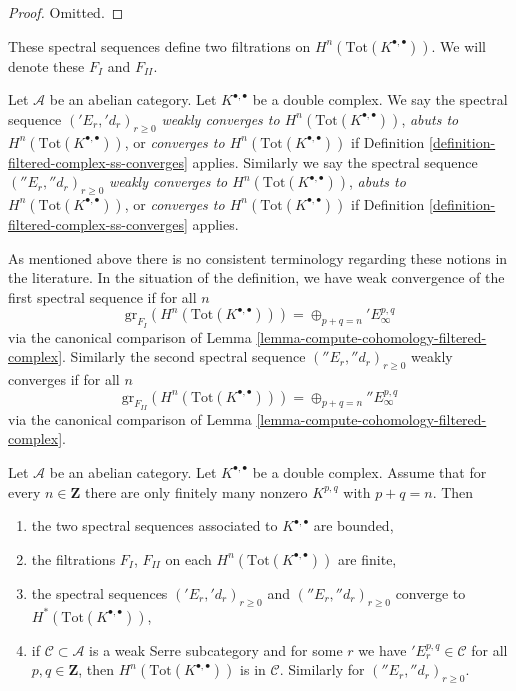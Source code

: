 \begin{proof}
Omitted.
\end{proof}

\noindent
These spectral sequences define two filtrations on
$H^n(\text{Tot}(K^{\bullet, \bullet}))$.
We will denote these $F_I$ and $F_{II}$.

\begin{definition}
\label{definition-ss-double-complex-converge}
Let $\mathcal{A}$ be an abelian category.
Let $K^{\bullet, \bullet}$ be a double complex.
We say the spectral sequence $({}'E_r, {}'d_r)_{r \geq 0}$
{\it weakly converges to $H^n(\text{Tot}(K^{\bullet, \bullet}))$},
{\it abuts to $H^n(\text{Tot}(K^{\bullet, \bullet}))$}, or
{\it converges to $H^n(\text{Tot}(K^{\bullet, \bullet}))$}
if Definition \ref{definition-filtered-complex-ss-converges} applies.
Similarly we say the spectral sequence $({}''E_r, {}''d_r)_{r \geq 0}$
{\it weakly converges to $H^n(\text{Tot}(K^{\bullet, \bullet}))$},
{\it abuts to $H^n(\text{Tot}(K^{\bullet, \bullet}))$}, or
{\it converges to $H^n(\text{Tot}(K^{\bullet, \bullet}))$}
if Definition \ref{definition-filtered-complex-ss-converges} applies.
\end{definition}

\noindent
As mentioned above there is no consistent terminology regarding these
notions in the literature. In the situation of the definition, we have
weak convergence of the first spectral sequence if for all $n$
$$
\text{gr}_{F_I}(H^n(\text{Tot}(K^{\bullet, \bullet}))) =
\oplus_{p + q = n} {}'E_\infty^{p, q}
$$
via the canonical comparison of
Lemma \ref{lemma-compute-cohomology-filtered-complex}.
Similarly the second spectral sequence $({}''E_r, {}''d_r)_{r \geq 0}$
weakly converges if for all $n$
$$
\text{gr}_{F_{II}}(H^n(\text{Tot}(K^{\bullet, \bullet}))) =
\oplus_{p + q = n} {}''E_\infty^{p, q}
$$
via the canonical comparison of
Lemma \ref{lemma-compute-cohomology-filtered-complex}.

\begin{lemma}
\label{lemma-first-quadrant-ss}
Let $\mathcal{A}$ be an abelian category. Let $K^{\bullet, \bullet}$
be a double complex. Assume that for every $n \in \mathbf{Z}$ there are
only finitely many nonzero $K^{p, q}$ with $p + q = n$. Then
\begin{enumerate}
\item the two spectral sequences associated to $K^{\bullet, \bullet}$
are bounded,
\item the filtrations $F_I$, $F_{II}$ on each
$H^n(\text{Tot}(K^{\bullet, \bullet}))$ are finite,
\item the spectral sequences $({}'E_r, {}'d_r)_{r \geq 0}$ and
$({}''E_r, {}''d_r)_{r \geq 0}$ converge to
$H^*(\text{Tot}(K^{\bullet, \bullet}))$,
\item if $\mathcal{C} \subset \mathcal{A}$ is a weak Serre subcategory
and for some $r$ we have ${}'E_r^{p, q} \in \mathcal{C}$ for all
$p, q \in \mathbf{Z}$, then $H^n(\text{Tot}(K^{\bullet, \bullet}))$
is in $\mathcal{C}$. Similarly for $({}''E_r, {}''d_r)_{r \geq 0}$.
\end{enumerate}
\end{lemma}

